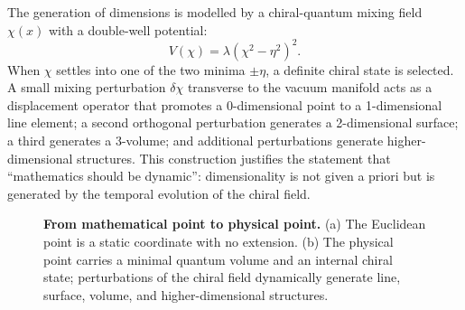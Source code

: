 \documentclass[11pt,a4paper]{article}
\begin{document}
The generation of dimensions is modelled by a chiral-quantum mixing field $\chi(x)$ with a double-well potential:
\begin{equation}
V(\chi) = \lambda (\chi^2 - \eta^2)^2.
\label{eq:potential}
\end{equation}
When $\chi$ settles into one of the two minima $\pm\eta$, a definite chiral state is selected. A small mixing perturbation $\delta\chi$ transverse to the vacuum manifold acts as a displacement operator that promotes a 0-dimensional point to a 1-dimensional line element; a second orthogonal perturbation generates a 2-dimensional surface; a third generates a 3-volume; and additional perturbations generate higher-dimensional structures. This construction justifies the statement that ``mathematics should be dynamic'': dimensionality is not given a priori but is generated by the temporal evolution of the chiral field.

\begin{figure}[htbp]
\centering
{}
\caption{\textbf{From mathematical point to physical point.} (a) The Euclidean point is a static coordinate with no extension. (b) The physical point carries a minimal quantum volume and an internal chiral state; perturbations of the chiral field dynamically generate line, surface, volume, and higher-dimensional structures.}
\label{fig:point}
\end{figure}
\end{document}
